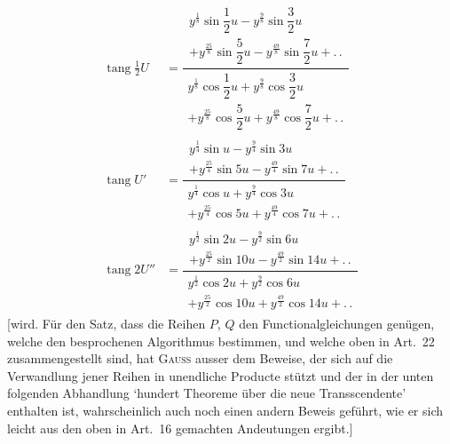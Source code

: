 
\[
\begin{aligned}
\operatorname{tang}\tfrac12 U
 &=\dfrac{\begin{gathered}y^{\frac18}\sin\dfrac12u-y^{\frac98}\sin\dfrac32u\\[3pt]+y^{\frac{25}8}\sin\dfrac52u-y^{\frac{49}8}\sin\dfrac72u+\mathord{.}\,\mathord{.}\end{gathered}}{\begin{gathered}y^{\frac18}\cos\dfrac12u+y^{\frac98}\cos\dfrac32u\\[3pt]+y^{\frac{25}8}\cos\dfrac52u+y^{\frac{49}8}\cos\dfrac72u+\mathord{.}\,\mathord{.}\end{gathered}}\\[14pt]
\operatorname{tang} U'
 &=\dfrac{\begin{gathered}y^{\frac14}\sin u-y^{\frac94}\sin3u\\[3pt]+y^{\frac{25}4}\sin5u-y^{\frac{49}4}\sin7u+\mathord{.}\,\mathord{.}\end{gathered}}{\begin{gathered}y^{\frac14}\cos u+y^{\frac94}\cos3u\\[3pt]+y^{\frac{25}4}\cos5u+y^{\frac{49}4}\cos7u+\mathord{.}\,\mathord{.}\end{gathered}}\\[14pt]
\operatorname{tang}2U''
 &=\dfrac{\begin{gathered}y^{\frac12}\sin2u-y^{\frac92}\sin6u\\[3pt]+y^{\frac{25}2}\sin10u-y^{\frac{49}2}\sin14u+\mathord{.}\,\mathord{.}\end{gathered}}{\begin{gathered}y^{\frac12}\cos2u+y^{\frac92}\cos6u\\[3pt]+y^{\frac{25}2}\cos10u+y^{\frac{49}2}\cos14u+\mathord{.}\,\mathord{.}\end{gathered}}
\end{aligned}
\]
[wird. Für den Satz, dass die Reihen $P$, $Q$ den Functionalgleichungen genügen,
welche den besprochenen Algorithmus bestimmen, und welche oben in Art.~22
zusammengestellt sind, hat \textsc{Gauss} ausser dem Beweise, der sich auf die
Verwandlung jener Reihen in unendliche Producte stützt und der in der unten
folgenden Abhandlung `hundert Theoreme über die neue Transscendente' enthalten
ist, wahrscheinlich auch noch einen andern Beweis geführt, wie er sich leicht
aus den oben in Art.~16 gemachten Andeutungen ergibt.]

